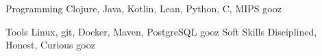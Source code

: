 

\begin{cvskills}

  \cvskill
    {Programming} %
    {Clojure, Java, Kotlin, Lean, Python, C, MIPS} %
    {gooz}

  \cvskill
    {Tools} %
    {Linux, git, Docker, Maven, PostgreSQL} %
    {gooz}
  \cvskill
    {Soft Skills} %
    {Disciplined, Honest, Curious} %
    {gooz}

\end{cvskills}
